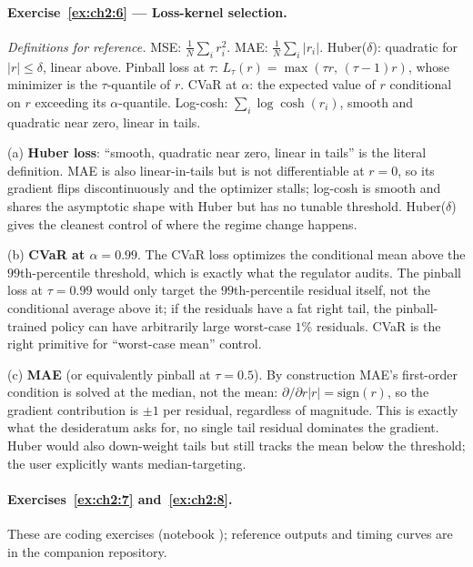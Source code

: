 \documentclass[11pt,a4paper]{report}
\begin{document}
\paragraph{Exercise~\ref{ex:ch2:6} --- Loss-kernel selection.}
\emph{Definitions for reference.}  MSE: $\frac{1}{N}\sum_i r_i^2$.  MAE: $\frac{1}{N}\sum_i |r_i|$.  Huber($\delta$): quadratic for $|r| \le \delta$, linear above.  Pinball loss at $\tau$: $L_\tau(r) = \max(\tau r,\, (\tau - 1)r)$, whose minimizer is the $\tau$-quantile of $r$.  CVaR at $\alpha$: the expected value of $r$ conditional on $r$ exceeding its $\alpha$-quantile.  Log-cosh: $\sum_i \log\cosh(r_i)$, smooth and quadratic near zero, linear in tails.

(a) \textbf{Huber loss}: ``smooth, quadratic near zero, linear in tails'' is the literal definition.  MAE is also linear-in-tails but is not differentiable at $r=0$, so its gradient flips discontinuously and the optimizer stalls; log-cosh is smooth and shares the asymptotic shape with Huber but has no tunable threshold.  Huber($\delta$) gives the cleanest control of where the regime change happens.

(b) \textbf{CVaR at $\alpha = 0.99$}.  The CVaR loss optimizes the conditional mean above the $99$th-percentile threshold, which is exactly what the regulator audits.  The pinball loss at $\tau = 0.99$ would only target the $99$th-percentile residual itself, not the conditional average above it; if the residuals have a fat right tail, the pinball-trained policy can have arbitrarily large worst-case $1\%$ residuals.  CVaR is the right primitive for ``worst-case mean'' control.

(c) \textbf{MAE} (or equivalently pinball at $\tau = 0.5$).  By construction MAE's first-order condition is solved at the median, not the mean: $\partial/\partial r |r| = \mathrm{sign}(r)$, so the gradient contribution is $\pm 1$ per residual, regardless of magnitude.  This is exactly what the desideratum asks for, no single tail residual dominates the gradient.  Huber would also down-weight tails but still tracks the mean below the threshold; the user explicitly wants median-targeting.

\paragraph{Exercises~\ref{ex:ch2:7} and~\ref{ex:ch2:8}.}
These are coding exercises (notebook ); reference outputs and timing curves are in the companion repository.
\end{document}
